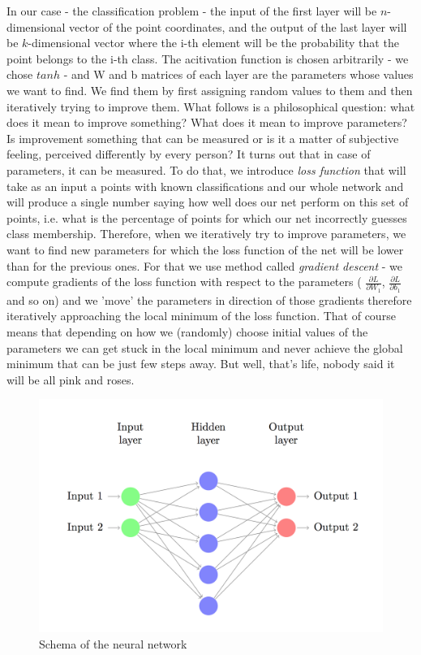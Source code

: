 \documentclass[3p,twocolumn]{elsarticle}
\begin{document}
In our case - the classification problem - the input of the first layer will be $n$-dimensional vector of the point coordinates, and the output of the last layer will be $k$-dimensional vector where the i-th element will be the probability that the point belongs to the i-th class. The acitivation function is chosen arbitrarily - we chose $tanh$ - and W and b matrices of each layer are the parameters whose values we want to find. We find them by first assigning random values to them and then iteratively trying to improve them. What follows is a philosophical question: what does it mean to improve something? What does it mean to improve parameters? Is improvement something that can be measured or is it a matter of subjective feeling, perceived differently by every person? It turns out that in case of parameters, it can be measured. To do that, we introduce \emph{loss function} that will take as an input a points with known classifications and our whole network and will produce a single number saying how well does our net perform on this set of points, i.e. what is the percentage of points for which our net incorrectly guesses class membership. Therefore, when we iteratively try to improve parameters, we want to find new parameters for which the loss function of the net will be lower than for the previous ones. For that we use method called \emph{gradient descent} -  we compute gradients of the loss function with respect to the parameters ( $\frac{\partial L}{\partial W_1}$, $\frac{\partial L}{\partial b_1}$ and so on) and we 'move' the parameters in direction of those gradients therefore iteratively approaching the local minimum of the loss function. That of course means that depending on how we (randomly) choose initial values of the parameters we can get stuck in the local minimum and never achieve the global minimum that can be just few steps away. But well, that's life, nobody said it will be all pink and roses.

\begin{figure}[h]
	
\label{fig:fig2}
  \includegraphics[width=\linewidth]{network-schema.png}
	\caption{Schema of the neural network}
	\label{fig2}
\end{figure}
\end{document}
